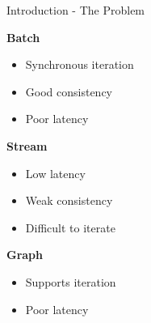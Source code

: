 \begin{frame}[t]{Introduction - The Problem}
  \vspace{0.25cm}

  \textbf{Batch}
  \begin{itemize}
    \item Synchronous iteration
    \item Good consistency
    \item Poor latency
  \end{itemize}

  \vspace{0.25cm}

  \textbf{Stream}
  \begin{itemize}
    \item Low latency
    \item Weak consistency
    \item Difficult to iterate
  \end{itemize}

  \vspace{0.25cm}
  
  \textbf{Graph}
  \begin{itemize}
    \item Supports iteration
    \item Poor latency
  \end{itemize}


\end{frame}

